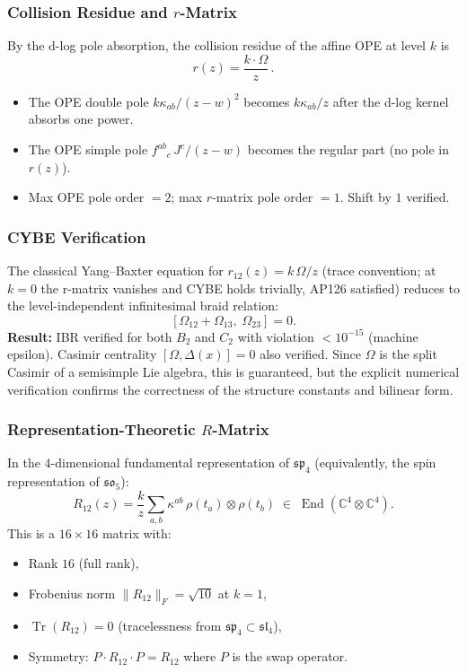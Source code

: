 \subsubsection*{Collision Residue and $r$-Matrix}

By the d-log pole absorption, the collision residue of the affine
OPE at level $k$ is
\[
 r(z) = \frac{k \cdot \Omega}{z}\,.
\]
\begin{itemize}
\item The OPE double pole $k\kappa_{ab}/(z{-}w)^2$ becomes
 $k\kappa_{ab}/z$ after the d-log kernel absorbs one power.
\item The OPE simple pole $f^{ab}{}_c\, J^c/(z{-}w)$ becomes the
 regular part (no pole in $r(z)$).
\item Max OPE pole order $= 2$; max $r$-matrix pole order $= 1$.
 Shift by $1$ verified.
\end{itemize}

\subsubsection*{CYBE Verification}

The classical Yang--Baxter equation for $r_{12}(z) = k\,\Omega/z$
(trace convention; at $k=0$ the r-matrix vanishes and CYBE holds trivially,
AP126 satisfied) reduces to the level-independent infinitesimal braid relation:
\[
 [\Omega_{12} + \Omega_{13},\; \Omega_{23}] = 0.
\]
\textbf{Result:} IBR verified for both $B_2$ and $C_2$ with violation
$< 10^{-15}$ (machine epsilon). Casimir centrality $[\Omega, \Delta(x)] = 0$
also verified. Since $\Omega$ is the split Casimir of a semisimple Lie algebra,
this is guaranteed, but the explicit numerical verification confirms the
correctness of the structure constants and bilinear form.

\subsubsection*{Representation-Theoretic $R$-Matrix}

In the $4$-dimensional fundamental representation of $\mathfrak{sp}_4$
(equivalently, the spin representation of $\mathfrak{so}_5$):
\[
 R_{12}(z) = \frac{k}{z} \sum_{a,b} \kappa^{ab}\,
 \rho(t_a) \otimes \rho(t_b)
 \;\in\; \operatorname{End}(\mathbb{C}^4 \otimes \mathbb{C}^4).
\]
This is a $16 \times 16$ matrix with:
\begin{itemize}
\item Rank $16$ (full rank),
\item Frobenius norm $\|R_{12}\|_F = \sqrt{10}$ at $k = 1$,
\item $\operatorname{Tr}(R_{12}) = 0$ (tracelessness from $\mathfrak{sp}_4 \subset \mathfrak{sl}_4$),
\item Symmetry: $P \cdot R_{12} \cdot P = R_{12}$ where $P$ is the swap operator.
\end{itemize}

